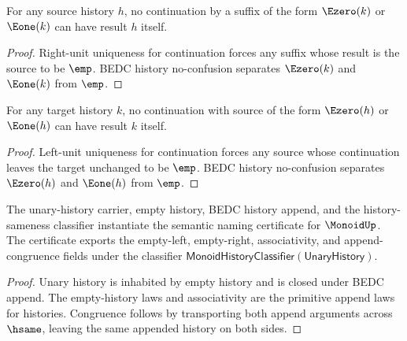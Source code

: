 \begin{theorem}
\label{thm:history-continuation-nonempty-suffix-source-absurd}
For any source history \(h\), no continuation by a suffix of the form \(\Ezero(k)\)
or \(\Eone(k)\) can have result \(h\) itself.
\end{theorem}
\begin{proof}
Right-unit uniqueness for continuation forces any suffix whose result is the
source to be \(\emp\). BEDC history no-confusion separates \(\Ezero(k)\) and
\(\Eone(k)\) from \(\emp\).
\end{proof}

\begin{theorem}
\label{thm:history-continuation-nonempty-prefix-target-absurd}
For any target history $k$, no continuation with source of the form
$\Ezero(h)$ or $\Eone(h)$ can have result $k$ itself.
\end{theorem}
\begin{proof}
Left-unit uniqueness for continuation forces any source whose continuation
leaves the target unchanged to be $\emp$. BEDC history no-confusion separates
$\Ezero(h)$ and $\Eone(h)$ from $\emp$.
\end{proof}

\begin{theorem}
\label{thm:unary-append-monoid-semantic-name-certificate}
The unary-history carrier, empty history, BEDC history append, and the
history-sameness classifier instantiate the semantic naming certificate for
\(\MonoidUp\). The certificate exports the empty-left, empty-right,
associativity, and append-congruence fields under the classifier
\(\mathsf{MonoidHistoryClassifier}(\mathsf{UnaryHistory})\).
\end{theorem}
\begin{proof}
Unary history is inhabited by empty history and is closed under BEDC append.
The empty-history laws and associativity are the primitive append laws for
histories. Congruence follows by transporting both append arguments across
\(\hsame\), leaving the same appended history on both sides.
\end{proof}

